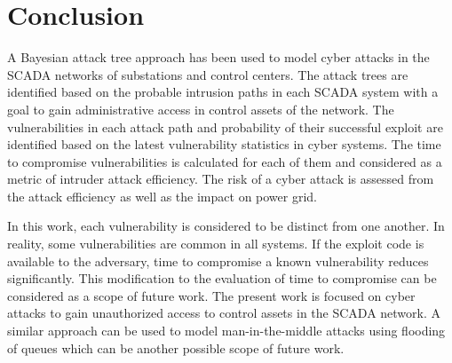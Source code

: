 \section{Conclusion}\label{sec:conclude}
A Bayesian attack tree approach has been used to model cyber attacks in the SCADA networks of substations and control centers. The attack trees are identified based on the probable intrusion paths in each SCADA system with a goal to gain administrative access in control assets of the network. The vulnerabilities in each attack path and probability of their successful exploit are identified based on the latest vulnerability statistics in cyber systems. The time to compromise vulnerabilities is calculated for each of them and considered as a metric of intruder attack efficiency. The risk of a cyber attack is assessed from the attack efficiency as well as the impact on power grid.

In this work, each vulnerability is considered to be distinct from one another. In reality, some vulnerabilities are common in all systems. If the exploit code is available to the adversary, time to compromise a known vulnerability reduces significantly. This modification to the evaluation of time to compromise can be considered as a scope of future work. The present work is focused on cyber attacks to gain unauthorized access to control assets in the SCADA network. A similar approach can be used to model man-in-the-middle attacks using flooding of queues which can be another possible scope of future work. 
